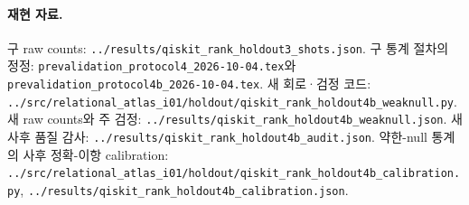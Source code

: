 \documentclass[11pt,a4paper]{article}
\begin{document}
\paragraph{재현 자료.}
구 raw counts: \texttt{../results/qiskit\_rank\_holdout3\_shots.json}.
구 통계 절차의 정정: \texttt{prevalidation\_protocol4\_2026-10-04.tex}와
\texttt{prevalidation\_protocol4b\_2026-10-04.tex}.
새 회로·검정 코드: \texttt{../src/relational\_atlas\_i01/holdout/qiskit\_rank\_holdout4b\_weaknull.py}.
새 raw counts와 주 검정:
\texttt{../results/qiskit\_rank\_holdout4b\_weaknull.json}.
새 사후 품질 감사:
\texttt{../results/qiskit\_rank\_holdout4b\_audit.json}.
약한-null 통계의 사후 정확-이항 calibration:
\texttt{../src/relational\_atlas\_i01/holdout/qiskit\_rank\_holdout4b\_calibration.py},
\texttt{../results/qiskit\_rank\_holdout4b\_calibration.json}.
\end{document}
